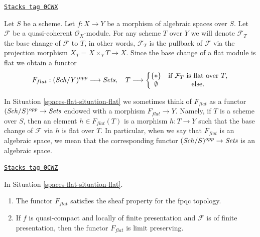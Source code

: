 \begin{definition}
\label{spaces-flat-situation-flat}
\href{https://stacks.math.columbia.edu/tag/0CWX}{\texttt{Stacks tag 0CWX}}

Let $S$ be a scheme.
Let $f : X \to Y$ be a morphism of algebraic spaces over $S$.
Let $\mathcal{F}$ be a quasi-coherent $\mathcal{O}_X$-module.
For any scheme $T$ over $Y$ we will denote $\mathcal{F}_T$ the
base change of $\mathcal{F}$ to $T$, in other words, $\mathcal{F}_T$
is the pullback of $\mathcal{F}$ via the projection morphism
$X_T = X \times_Y T \to X$. Since the base change of a flat module
is flat we obtain a functor
\begin{equation}
\label{equation-flat}
F_{flat} : (\mathit{Sch}/Y)^{opp} \longrightarrow \textit{Sets}, \quad
T \longrightarrow \left\{
\begin{matrix}
\{*\} & \text{if } \mathcal{F}_T \text{ is flat over }T, \\
\emptyset & \text{else.}
\end{matrix}
\right.
\end{equation}
\end{definition}

In Situation \ref{spaces-flat-situation-flat} we sometimes think of $F_{flat}$ as a functor
$(\mathit{Sch}/S)^{opp} \to \textit{Sets}$ endowed with a morphism
$F_{flat} \to Y$. Namely, if $T$ is a scheme over $S$, then
an element $h \in F_{flat}(T)$ is a morphism $h : T \to Y$
such that the base change of $\mathcal{F}$ via $h$ is flat over $T$.
In particular, when we say
that $F_{flat}$ is an algebraic space, we mean that the corresponding
functor $(\mathit{Sch}/S)^{opp} \to \textit{Sets}$ is an algebraic space.

\begin{lemma}[Flat]
\label{spaces-flat-lemma-flat}
\href{https://stacks.math.columbia.edu/tag/0CWZ}{\texttt{Stacks tag 0CWZ}}

In Situation \ref{spaces-flat-situation-flat}.
\begin{enumerate}
\item The functor $F_{flat}$ satisfies the sheaf property for the fpqc topology.
\item If $f$ is quasi-compact and locally of finite presentation
and $\mathcal{F}$ is of finite presentation, then the functor
$F_{flat}$ is limit preserving.
\end{enumerate}
\end{lemma}

